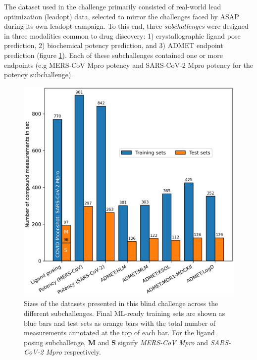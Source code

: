 \documentclass[journal=jcim,manuscript=article]{achemso}
\begin{document}
The dataset used in the challenge primarily consisted of real-world lead optimization (leadopt) data, selected to mirror the challenges faced by ASAP during its own leadopt campaign. To this end, three \textit{subchallenges} were designed in three modalities common to drug discovery: 1) crystallographic ligand pose prediction, 2) biochemical potency prediction, and 3) ADMET endpoint prediction (figure \ref{fgr:datasets_overview}). Each of these subchallenges contained one or more endpoints (e.g MERS-CoV Mpro potency and SARS-CoV-2 Mpro potency for the potency subchallenge).


\begin{figure}
    \includegraphics[scale=0.5]{01_figs_introduction/datasets_overview.png}
  \caption{Sizes of the datasets presented in this blind challenge across the different subchallenges. Final ML-ready training sets are shown as blue bars and test sets as orange bars with the total number of measurements annotated at the top of each bar. For the ligand posing subchallenge, \textbf{M} and \textbf{S} signify \textit{MERS-CoV Mpro} and \textit{SARS-CoV-2 Mpro} respectively. }
  \label{fgr:datasets_overview}
\end{figure}
\end{document}
